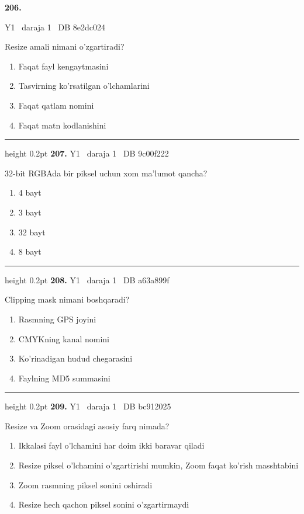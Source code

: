 \documentclass[10pt,a4paper,oneside]{article}
\begin{document}
\hypertarget{q206}{\textbf{\color{ink}206.}}  {\color{muted}\scriptsize Y1 \textbullet\ daraja 1 \textbullet\ DB 8e2dc024}
\par
Resize amali nimani o'zgartiradi?
\begin{enumerate}[label=\Alph*),leftmargin=9mm]
\item Faqat fayl kengaytmasini
\item Tasvirning ko'rsatilgan o'lchamlarini
\item Faqat qatlam nomini
\item Faqat matn kodlanishini
\end{enumerate}
\vspace{2mm}\hrule height 0.2pt \vspace{4mm}
\hypertarget{q207}{\textbf{\color{ink}207.}}  {\color{muted}\scriptsize Y1 \textbullet\ daraja 1 \textbullet\ DB 9c00f222}
\par
32-bit RGBAda bir piksel uchun xom ma'lumot qancha?
\begin{enumerate}[label=\Alph*),leftmargin=9mm]
\item 4 bayt
\item 3 bayt
\item 32 bayt
\item 8 bayt
\end{enumerate}
\vspace{2mm}\hrule height 0.2pt \vspace{4mm}
\hypertarget{q208}{\textbf{\color{ink}208.}}  {\color{muted}\scriptsize Y1 \textbullet\ daraja 1 \textbullet\ DB a63a899f}
\par
Clipping mask nimani boshqaradi?
\begin{enumerate}[label=\Alph*),leftmargin=9mm]
\item Rasmning GPS joyini
\item CMYKning kanal nomini
\item Ko'rinadigan hudud chegarasini
\item Faylning MD5 summasini
\end{enumerate}
\vspace{2mm}\hrule height 0.2pt \vspace{4mm}
\hypertarget{q209}{\textbf{\color{ink}209.}}  {\color{muted}\scriptsize Y1 \textbullet\ daraja 1 \textbullet\ DB bc912025}
\par
Resize va Zoom orasidagi asosiy farq nimada?
\begin{enumerate}[label=\Alph*),leftmargin=9mm]
\item Ikkalasi fayl o'lchamini har doim ikki baravar qiladi
\item Resize piksel o'lchamini o'zgartirishi mumkin, Zoom faqat ko'rish masshtabini
\item Zoom rasmning piksel sonini oshiradi
\item Resize hech qachon piksel sonini o'zgartirmaydi
\end{enumerate}
\end{document}
